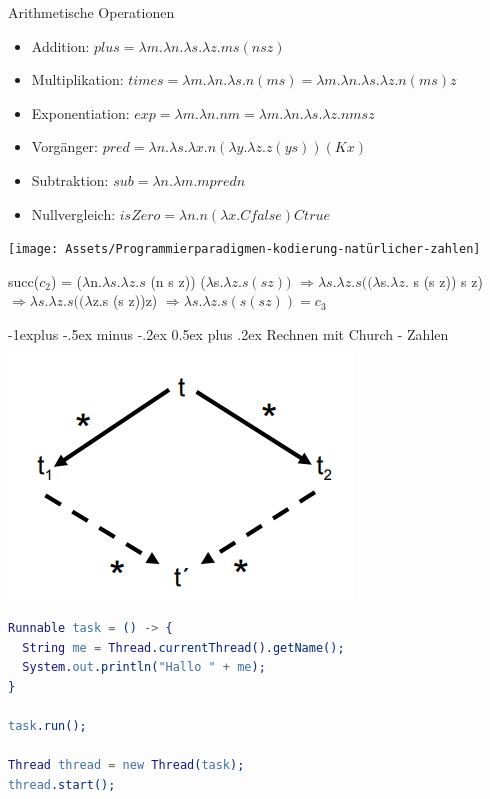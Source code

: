 \documentclass[10pt]{article}
\makeatletter
\renewcommand{\subsection}{\@startsection{subsection}{2}{0mm}%
                                {-1explus -.5ex minus -.2ex}%
                                {0.5ex plus .2ex}%
                                {\normalfont\normalsize\bfseries}}
\makeatother
\begin{document}
  Arithmetische Operationen
  \begin{itemize}
    \item Addition:   $plus = \lambda m. \lambda n. \lambda s. \lambda z. m s (n s z)$
    \item Multiplikation: $times = \lambda m. \lambda n. \lambda s. n (m s) = \lambda m. \lambda n. \lambda s. \lambda z. n (m s) z$
    \item Exponentiation: $exp = \lambda m. \lambda n. n m = \lambda m. \lambda n. \lambda s. \lambda z. n m s z$
    \item Vorgänger:  $pred = \lambda n.\lambda s.\lambda x. n (\lambda y.\lambda z. z (y s))(K x)$
    \item Subtraktion: $sub = \lambda n.\lambda m. m pred n$
    \item Nullvergleich: $isZero = \lambda n. n (\lambda x. C false ) C true$
  \end{itemize}
  \begin{center}
    \texttt{[image: Assets/Programmierparadigmen-kodierung-natürlicher-zahlen]}
  \end{center}
  
  succ($c_2$) = ($\lambda$\color{blue}n\color{black}.$\lambda s.\lambda z.s$ (\color{blue}n\color{black} s z)) \color{red} ($\lambda$s.$\lambda z.s (s z))$ \color{black}
  \subitem $\Rightarrow\lambda s.\lambda z.s ((\lambda$\color{blue}s\color{black}.$\lambda z.$ \color{blue} s \color{black}(\color{blue}s\color{black} z)) s z)
  \subitem $\Rightarrow\lambda s.\lambda z.s((\lambda$\color{blue}z\color{black}.s (s \color{blue}z\color{black}))\color{red}z\color{black})
  \subitem $\Rightarrow\lambda s.\lambda z.s(s(s z)) = c_3$

  \subsection{Rechnen mit Church - Zahlen }
  \includegraphics[width=0.4\linewidth]{Assets/Programmierparadigmen-diamant-eigenschaft}
  \begin{lstlisting}[language=erlang]
Runnable task = () -> {
  String me = Thread.currentThread().getName();
  System.out.println("Hallo " + me);
}

task.run();

Thread thread = new Thread(task);
thread.start();
\end{lstlisting}
  
\end{document}
